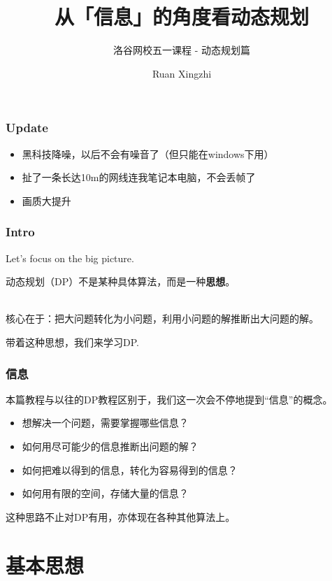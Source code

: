\documentclass{beamer}
\title{从「信息」的角度看动态规划}
\subtitle{洛谷网校五一课程 - 动态规划篇}
\author{Ruan Xingzhi}
\institute{洛谷网校}
\begin{document}
\begin{titlepage}
    
\end{titlepage}

\begin{frame}
    \frametitle{Update}

    \begin{itemize}
        \item 黑科技降噪，以后不会有噪音了（但只能在windows下用）
        \item 扯了一条长达10m的网线连我笔记本电脑，不会丢帧了
        \item 画质大提升
    \end{itemize}

\end{frame}

\begin{frame}
    \frametitle{Intro}

    Let's focus on the big picture.

    动态规划（DP）不是某种具体算法，而是一种\textbf{思想}。

    ~\\

    核心在于：把大问题转化为小问题，利用小问题的解推断出大问题的解。

    带着这种思想，我们来学习DP.

\end{frame}

\begin{frame}
    \frametitle{信息}

    本篇教程与以往的DP教程区别于，我们这一次会不停地提到``信息''的概念。

    \begin{itemize}
        \item 想解决一个问题，需要掌握哪些信息？
        \item 如何用尽可能少的信息推断出问题的解？
        \item 如何把难以得到的信息，转化为容易得到的信息？
        \item 如何用有限的空间，存储大量的信息？
    \end{itemize}

    这种思路不止对DP有用，亦体现在各种其他算法上。


\end{frame}

\section{基本思想}
\end{document}
